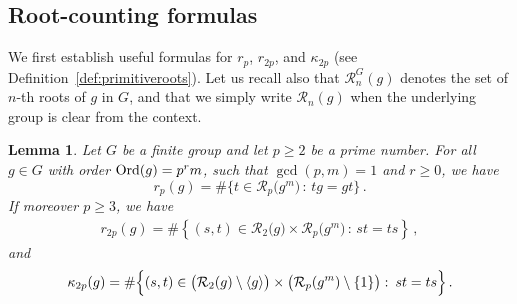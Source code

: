 \documentclass[12pt]{amsart}
\numberwithin{equation}{section}
\newcommand{\Ord}{{\rm Ord}}
\newtheorem{lem}[X]{Lemma}
\theoremstyle{definition}
\theoremstyle{remark}
\begin{document}
\subsection{Root-counting formulas}
We first establish useful formulas for $r_p$, $r_{2p}$, and $\kappa_{2p}$ (see Definition~\ref{def:primitiveroots}). Let us recall also that $\mathcal{R}_n^G(g)$ denotes the set of $n$-th roots of $g$ in $G$, and that we simply write $\mathcal{R}_n(g)$ when the underlying group is clear from the context.
\begin{lem}
    Let $G$ be a finite group and let $p\ge2$ be a prime number. For all $g\in G $ with order $\Ord(g)=p^rm$, such that $\gcd(p,m)=1$ and $r\ge0$, we have \begin{equation}\label{p-rootsnumber}
        r_p(g)=\#\{t\in \mathcal{R}_p\bigl(g^m\bigr)\, \colon\,  tg=gt\}\, .
    \end{equation}
    If moreover $p\ge3$, we have 
    \begin{align}
        r_{2p}(g)=\#\left\{(s,t)\in \mathcal{R}_2\bigl(g\bigr) \times\mathcal{R}_p\bigl(g^m\bigr)\, \colon\,  st=ts\right\}\label{2p-rootsnumb2}\, ,
    \end{align}
    and \begin{equation}\label{2p-primrootsnumb}
        \kappa_{2p}(g)=\#\Bigl\{(s,t)\in \bigl(\mathcal{R}_2(g)\setminus \langle g\rangle\bigr) \times \bigl(\mathcal{R}_p(g^m)\setminus\{1\}\bigr)\, \colon\,  st=ts\Bigr\}\, .
    \end{equation}
\end{lem}
\end{document}
